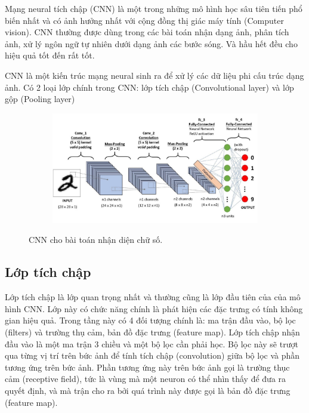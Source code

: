 Mạng neural tích chập (CNN) là một trong những mô hình học sâu\cite{repec} tiên tiến phổ biến nhất và
có ảnh hưởng nhất với cộng đồng thị giác máy tính (Computer vision). CNN thường được dùng
trong các bài toán nhận dạng ảnh, phân tích ảnh, xử lý ngôn ngữ tự nhiên dưới dạng ảnh các bước sóng.
Và hầu hết đều cho hiệu quả tốt đến rất tốt.

CNN là một kiến trúc mạng neural sinh ra để xử lý các dữ liệu phi cấu trúc dạng ảnh. Có 2 loại lớp
chính trong CNN: lớp tích chập (Convolutional layer) và lớp gộp (Pooling layer)

\begin{figure}
    \begin{subfigure}{1.\textwidth}
        \includegraphics[width=1.\linewidth]{Chapters/items/cnn2_1.jpg}
        \label{fig: chap2_2}
    \end{subfigure}
    \caption{CNN cho bài toán nhận diện chữ số.}
\end{figure}
\subsection{Lớp tích chập}

Lớp tích chập là lớp quan trọng nhất và thường cũng là lớp đầu tiên của của mô hình CNN.
Lớp này có chức năng chính là phát hiện các đặc trưng có tính không gian hiệu quả.
Trong tầng này có 4 đối tượng chính là: ma trận đầu vào, bộ lọc (filters) và trường thụ cảm,
bản đồ đặc trưng (feature map). Lớp tích chập nhận đầu vào là một ma trận 3 chiều và một bộ lọc cần phải học.
Bộ lọc này sẽ trượt qua từng vị trí trên bức ảnh để tính tích chập (convolution)
giữa bộ lọc và phần tương ứng trên bức ảnh. Phần tương ứng này trên bức ảnh gọi là
trường thục cảm (receptive field), tức là vùng mà một neuron có thể nhìn thấy để đưa
ra quyết định, và mà trận cho ra bởi quá trình này được gọi là bản đồ đặc trưng (feature map).

